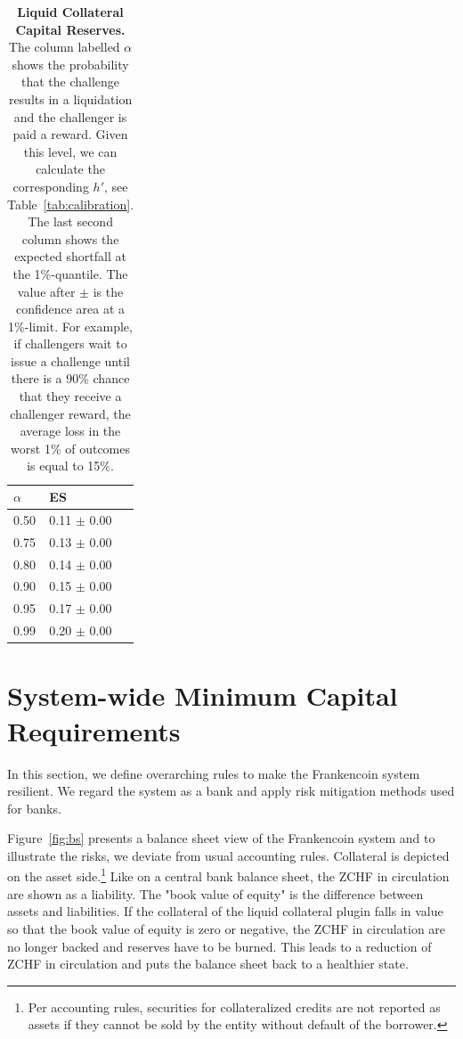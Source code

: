 \documentclass[english,11pt]{article}
\begin{document}
\begin{table}[h]
\caption{\textbf{Liquid Collateral Capital Reserves.} The column labelled $\alpha$ shows the probability
that the challenge results in a liquidation and the challenger is paid a reward.
Given this level, we can calculate the corresponding $h'$, see Table~\ref{tab:calibration}.
The last second column shows the expected shortfall at the 1\%-quantile. The value
after $\pm$ is the confidence area at a 1\%-limit. For example, if challengers wait to issue a challenge until
there is a 90\% chance that they receive a challenger reward, the average loss in the worst 1\% of outcomes
is equal to 15\%.
\label{tab:calibration2}}
\center
\begin{tabular}{lll}
\toprule
\textbf{$\alpha$} & \textbf{ES}   \\
\midrule
0.50                           & 0.11 $\pm$ 0.00 \\
0.75                           & 0.13 $\pm$ 0.00 \\
0.80                           & 0.14 $\pm$ 0.00 \\
0.90                           & 0.15 $\pm$ 0.00 \\
0.95                           & 0.17 $\pm$ 0.00 \\
0.99                           & 0.20 $\pm$ 0.00\\
\bottomrule
\end{tabular}
\end{table}


\section{System-wide Minimum Capital Requirements}
In this section, we define overarching rules to make the Frankencoin system
resilient. We regard the system as a bank and apply risk mitigation methods
used for banks.

Figure~\ref{fig:bs} presents a balance sheet view of the Frankencoin system
and to illustrate the risks, we deviate from usual accounting rules.
Collateral is depicted on the asset side.\footnote{Per accounting rules, 
securities for collateralized credits are not reported as assets
if they cannot be sold by the entity without default of the borrower.}
Like on a central bank balance sheet, the ZCHF in circulation are shown
as a liability. The "book value of equity" is the difference between assets
and liabilities. If the collateral of the liquid collateral plugin falls in value so that
the book value of equity is zero or negative, the ZCHF in circulation
are no longer backed and reserves have to be burned. This leads
to a reduction of ZCHF in circulation and puts the balance sheet back to
a healthier state.
\end{document}
